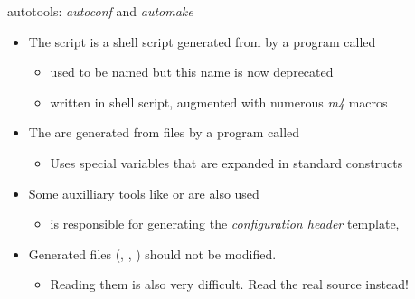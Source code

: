 \begin{frame}{autotools: {\em autoconf} and {\em automake}}
  \begin{itemize}
  \item The  script is a shell script generated from
     by a program called 
    \begin{itemize}
    \item {} used to be named  but
      this name is now deprecated
    \item written in shell script, augmented with numerous {\em m4}
      macros
    \end{itemize}
  \item The  are generated from 
    files by a program called 
    \begin{itemize}
    \item Uses special  variables that are expanded in
      standard  constructs
    \end{itemize}
  \item Some auxilliary tools like  or 
    are also used
    \begin{itemize}
    \item {} is responsible for generating the {\em
        configuration header} template, 
    \end{itemize}
  \item Generated files (, ,
    ) should not be modified.
    \begin{itemize}
    \item Reading them is also very difficult. Read the real source
      instead!
    \end{itemize}
  \end{itemize}
\end{frame}

